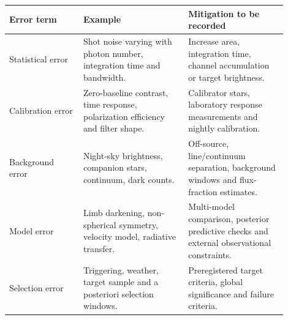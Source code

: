 \begin{longtable}{p{0.24\linewidth}p{0.34\linewidth}p{0.32\linewidth}}
\toprule
Error term & Example & Mitigation to be recorded \\
\midrule
Statistical error & Shot noise varying with photon number, integration time and bandwidth. & Increase area, integration time, channel accumulation or target brightness. \\
Calibration error & Zero-baseline contrast, time response, polarization efficiency and filter shape. & Calibrator stars, laboratory response measurements and nightly calibration. \\
Background error & Night-sky brightness, companion stars, continuum, dark counts. & Off-source, line/continuum separation, background windows and flux-fraction estimates. \\
Model error & Limb darkening, non-spherical symmetry, velocity model, radiative transfer. & Multi-model comparison, posterior predictive checks and external observational constraints. \\
Selection error & Triggering, weather, target sample and a posteriori selection windows. & Preregistered target criteria, global significance and failure criteria. \\
\bottomrule
\end{longtable}
